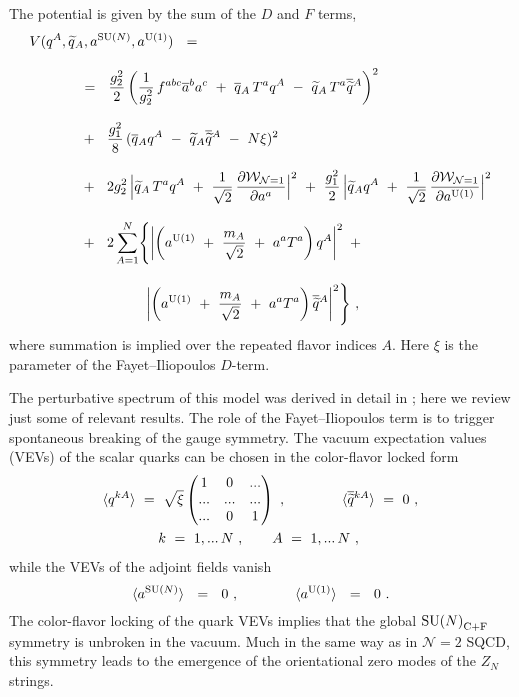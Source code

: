 \documentclass[12pt]{article}
\def\beq{\begin{equation}}
\def\eeq{\end{equation}}
\newcommand{\ntwo}{${\mathcal N}=2$ }
\newcommand{\p}{\partial}
\newcommand{\wt}{\widetilde}
\newcommand{\ov}{\overline}
\newcommand{\mc}[1]{\mathcal{#1}}
\def\cfl {$\text{SU($N$)}_{\rm C+F}$ }
\newcommand{\aU}{a^{\rm U(1)}}
\newcommand{\aN}{a^\text{SU($N$)}}
\begin{document}
The potential is given by the  sum of the $ D $ and $ F $ terms,
\begin{align}
%
\notag
	& V(q^A, \wt{q}{}_A, \aN, \aU) ~~=~~ 
	\\[3mm]
%
\notag
	&\qquad\quad ~~=~~
			\frac{g_2^2}{2} \left( \frac{1}{g_2^2}\,f^{abc}\ov{a}{}^b a^c 
				~+~ \ov{q}{}_A\, T^a q^A ~-~ \wt{q}{}_A\, T^a \ov{\wt{q}}{}^A \right)^2 
	\\[3mm]
%
\label{V}
	&\qquad\quad ~~+~~
		\frac{g_1^2}{8}\, (\ov{q}{}_A q^A ~-~ \wt{q}{}_A \ov{\wt{q}}{}^A ~-~ N\xi )^2
	\\[3mm]
%
\notag
	&\qquad\quad ~~+~~
		2g_2^2\, \Bigl| \wt{q}{}_A\,T^a q^A ~+~ 
			\frac{1}{\sqrt{2}}\, \frac{\p\mc{W}_{\mc{N}=1}}{\p a^a} \Bigr|^2
	~+~
	\frac{g_1^2}{2}\, \Bigl| \wt{q}{}_A q^A ~+~ 
			\frac{1}{\sqrt{2}}\, \frac{\p\mc{W}_{\mc{N}=1}}{\p\aU} \Bigr|^2
	\\[3mm]
%
\notag
	&\qquad\quad ~~+~~
	2 \sum_{A=1}^{N} \Biggl\{  
		\left| \left( \aU ~+~ \frac{m_A}{\sqrt{2}} ~+~ a^a T^a \right) q^A \right|^2  ~+~
	\\[3mm]
%
\notag
	&\phantom{\qquad\quad ~~+~~ 2 \sum_{A=1}^{N} \Biggl\{  }
		\left| \left( \aU ~+~ \frac{m_A}{\sqrt{2}} ~+~ a^a T^a \right) \ov{\wt{q}}{}^A \right|^2  
			\Biggr\}~,
\end{align}
	where summation is implied over the repeated flavor indices $A$.
	Here $\xi$ is the parameter of the Fayet--Iliopoulos $ D $-term. 

	The perturbative spectrum of this model was derived in detail in \cite{SYrev}; here
	we review just some of relevant results. 
	The role of the Fayet--Iliopoulos term is to trigger spontaneous breaking of the gauge 
	symmetry.
	The vacuum expectation values (VEVs) of the scalar quarks can be chosen in the 
	color-flavor locked form
\begin{align}
%
\notag
&
	\langle q^{kA} \rangle ~=~ \sqrt{\xi} 
		\begin{pmatrix}
			 1  &   0  &  ... \\
			... &  ... &  ... \\
			... &   0  &  1 
		\end{pmatrix} ~,
	\qquad\qquad 
	\langle \ov{\wt{q}}{}^{kA} \rangle ~=~ 0~,
	\\
%
\label{qVEV}
&
	\qquad\qquad  k~=~ 1,...\, N~, \qquad  A ~=~ 1,...\, N~,
\end{align}
	while the VEVs of the adjoint fields vanish
\beq
\label{aVEV}
	\langle \aN \rangle  ~~=~~ 0~, \qquad\qquad  \langle \aU \rangle ~~=~~ 0~.
\eeq
The color-flavor locking of the quark VEVs implies that the global \cfl 
	symmetry is unbroken in the vacuum.
	Much in the same way as in \ntwo SQCD, this symmetry leads to the emergence of the orientational
	zero modes of the $ Z_N $ strings.
\end{document}
